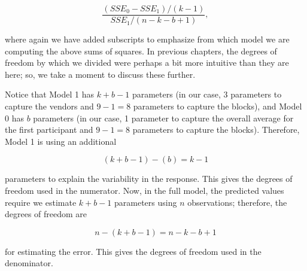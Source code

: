\documentclass[
  letterpaper,
  DIV=11,
  numbers=noendperiod]{scrreprt}
\theoremstyle{definition}
\theoremstyle{definition}
\theoremstyle{plain}
\theoremstyle{remark}
\begin{document}
\[\frac{\left(SSE_0 - SSE_1\right)/(k - 1)}{SSE_1/(n - k - b + 1)},\]

where again we have added subscripts to emphasize from which model we
are computing the above sums of squares. In previous chapters, the
degrees of freedom by which we divided were perhaps a bit more intuitive
than they are here; so, we take a moment to discuss these further.

Notice that Model 1 has \(k + b - 1\) parameters (in our case, 3
parameters to capture the vendors and \(9 - 1 = 8\) parameters to
capture the blocks), and Model 0 has \(b\) parameters (in our case, 1
parameter to capture the overall average for the first participant and
\(9 - 1 = 8\) parameters to capture the blocks). Therefore, Model 1 is
using an additional

\[(k + b - 1) - (b) = k - 1\]

parameters to explain the variability in the response. This gives the
degrees of freedom used in the numerator. Now, in the full model, the
predicted values require we estimate \(k + b - 1\) parameters using
\(n\) observations; therefore, the degrees of freedom are

\[n - (k + b - 1) = n - k - b + 1\]

for estimating the error. This gives the degrees of freedom used in the
denominator.
\end{document}
